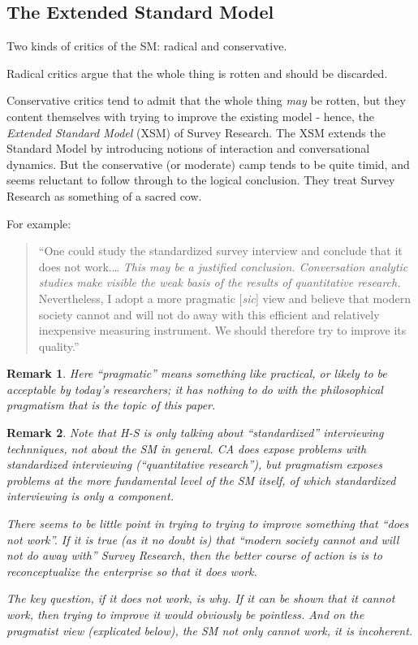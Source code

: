 \documentclass[11pt,twoside]{article}
\newtheorem{remark}{Remark}
\newcommand{\XSM}{Extended Standard Model}
\newcommand{\SR}{Survey Research}
\begin{document}
\subsection{The \XSM{}}

Two kinds of critics of the SM: radical and conservative.

Radical critics argue that the whole thing is rotten and should be
discarded.


Conservative critics tend to admit that the whole thing \textit{may}
be rotten, but they content themselves with trying to improve the
existing model - hence, the \textit{Extended Standard Model} (XSM) of
\SR{}.  The XSM extends the Standard Model by introducing notions of
interaction and conversational dynamics.  But the conservative (or
moderate) camp tends to be quite timid, and seems reluctant to follow
through to the logical conclusion.  They treat \SR{} as something of a
sacred cow.

For example:

\begin{quote}
``One could study the standardized survey interview and conclude that
  it does not work.\ldots{} \textit{This may be a justified
    conclusion.  Conversation analytic studies make visible the weak
    basis of the results of quantitative research.}  Nevertheless, I
  adopt a more pragmatic [\textit{sic}] view and believe that modern
  society cannot and will not do away with this efficient and
  relatively inexpensive measuring instrument.  We should therefore
  try to improve its quality.'' \parencite[Hanneke Houtkoop-Steenstra,
    quoted in][p. 275]{potter_review_2003}
\end{quote}

\begin{remark}
  Here ``pragmatic'' means something like practical, or likely to be
  acceptable by today's researchers; it has nothing to do with the
  philosophical pragmatism that is the topic of this paper.
\end{remark}

\begin{remark}
  Note that H-S is only talking about ``standardized'' interviewing
  technniques, not about the SM in general.  CA does expose problems
  with standardized interviewing (``quantitative research''), but
  pragmatism exposes problems at the more fundamental level of the SM
  itself, of which standardized interviewing is only a component.

  There seems to be little point in trying to trying to improve
  something that ``does not work''.  If it is true (as it no doubt is)
  that ``modern society cannot and will not do away with'' \SR{}, then
  the better course of action is is to reconceptualize the enterprise
  so that it does work.

  The key question, if it does not work, is why.  If it can be shown
  that it \textit{cannot} work, then trying to improve it would
  obviously be pointless.  And on the pragmatist view (explicated
  below), the SM not only cannot work, it is incoherent.
\end{remark}
\end{document}
